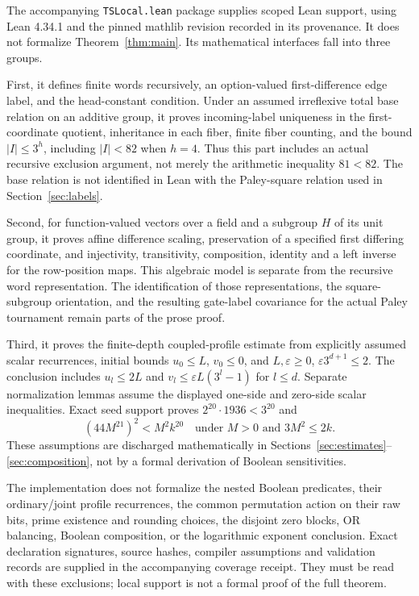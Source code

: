 The accompanying \texttt{TSLocal.lean} package supplies scoped Lean support, using Lean 4.34.1 and the pinned mathlib revision recorded in its provenance. It does not formalize Theorem~\ref{thm:main}. Its mathematical interfaces fall into three groups.

First, it defines finite words recursively, an option-valued first-difference edge label, and the head-constant condition. Under an assumed irreflexive total base relation on an additive group, it proves incoming-label uniqueness in the first-coordinate quotient, inheritance in each fiber, finite fiber counting, and the bound $|I|\le3^h$, including $|I|<82$ when $h=4$. Thus this part includes an actual recursive exclusion argument, not merely the arithmetic inequality $81<82$. The base relation is not identified in Lean with the Paley-square relation used in Section~\ref{sec:labels}.

Second, for function-valued vectors over a field and a subgroup $H$ of its unit group, it proves affine difference scaling, preservation of a specified first differing coordinate, and injectivity, transitivity, composition, identity and a left inverse for the row-position maps. This algebraic model is separate from the recursive word representation. The identification of those representations, the square-subgroup orientation, and the resulting gate-label covariance for the actual Paley tournament remain parts of the prose proof.

Third, it proves the finite-depth coupled-profile estimate from explicitly assumed scalar recurrences, initial bounds $u_0\le L$, $v_0\le0$, and $L,\varepsilon\ge0$, $\varepsilon3^{d+1}\le2$. The conclusion includes $u_l\le2L$ and $v_l\le\varepsilon L(3^l-1)$ for $l\le d$. Separate normalization lemmas assume the displayed one-side and zero-side scalar inequalities. Exact seed support proves $2^{20}\cdot1936<3^{20}$ and
\[
 (44M^{21})^2<M^2k^{20}
 \quad\text{under }M>0\text{ and }3M^2\le2k.
\]
These assumptions are discharged mathematically in Sections~\ref{sec:estimates}--\ref{sec:composition}, not by a formal derivation of Boolean sensitivities.

The implementation does not formalize the nested Boolean predicates, their ordinary/joint profile recurrences, the common permutation action on their raw bits, prime existence and rounding choices, the disjoint zero blocks, OR balancing, Boolean composition, or the logarithmic exponent conclusion. Exact declaration signatures, source hashes, compiler assumptions and validation records are supplied in the accompanying coverage receipt. They must be read with these exclusions; local support is not a formal proof of the full theorem.
